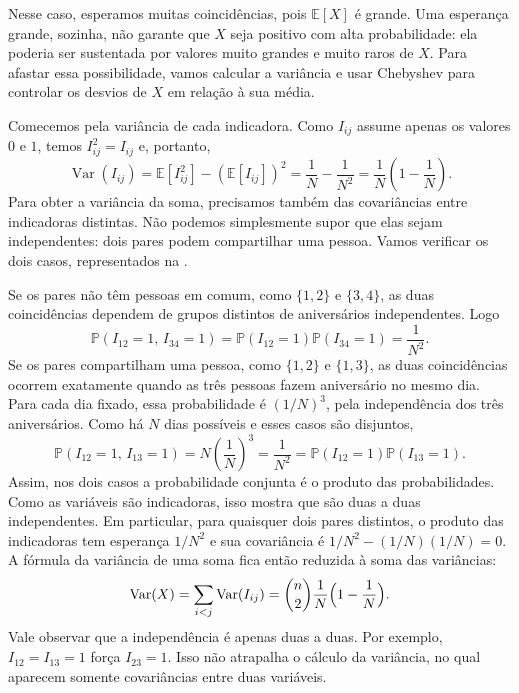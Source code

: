 \documentclass[12pt,portuguese]{article}
\theoremstyle{definition}
\theoremstyle{plainexercise}
\theoremstyle{starredexercise}
\theoremstyle{definition}
\begin{document}
Nesse caso, esperamos muitas coincidências, pois $\mathbb{E}[X]$ é grande.
Uma esperança grande, sozinha, não garante que $X$ seja positivo com alta
probabilidade: ela poderia ser sustentada por valores muito grandes e muito
raros de $X$. Para afastar essa possibilidade, vamos calcular a variância e
usar Chebyshev para controlar os desvios de $X$ em relação à sua média.

Comecemos pela variância de cada indicadora. Como $I_{ij}$ assume apenas
os valores $0$ e $1$, temos $I_{ij}^2=I_{ij}$ e, portanto,
\[
\operatorname{Var}(I_{ij})
=\mathbb{E}[I_{ij}^2]-(\mathbb{E}[I_{ij}])^2
=\frac1N-\frac1{N^2}
=\frac1N\left(1-\frac1N\right).
\]
Para obter a variância da soma, precisamos também das covariâncias entre
indicadoras distintas. Não podemos simplesmente supor que elas sejam
independentes: dois pares podem compartilhar uma pessoa. Vamos verificar
os dois casos, representados na .



Se os pares não têm pessoas em comum, como $\{1,2\}$ e $\{3,4\}$,
as duas coincidências dependem de grupos distintos de aniversários
independentes. Logo
\[
\mathbb{P}(I_{12}=1,\,I_{34}=1)
=\mathbb{P}(I_{12}=1)\mathbb{P}(I_{34}=1)
=\frac1{N^2}.
\]
Se os pares compartilham uma pessoa, como $\{1,2\}$ e $\{1,3\}$,
as duas coincidências ocorrem exatamente quando as três pessoas fazem
aniversário no mesmo dia. Para cada dia fixado, essa probabilidade é
$(1/N)^3$, pela independência dos três aniversários. Como há $N$ dias
possíveis e esses casos são disjuntos,
\[
\mathbb{P}(I_{12}=1,\,I_{13}=1)
=N\left(\frac1N\right)^3
=\frac1{N^2}
=\mathbb{P}(I_{12}=1)\mathbb{P}(I_{13}=1).
\]
Assim, nos dois casos a probabilidade conjunta é o produto das
probabilidades. Como as variáveis são indicadoras, isso mostra que são
duas a duas independentes. Em particular, para quaisquer dois pares
distintos, o produto das indicadoras tem esperança $1/N^2$ e sua
covariância é $1/N^2-(1/N)(1/N)=0$. A fórmula da variância de uma soma
fica então reduzida à soma das variâncias:
\[
\operatorname{Var}(X)
=
\sum_{i<j}\operatorname{Var}(I_{ij})
=
\binom{n}{2}\frac{1}{N}\Bigl(1-\frac{1}{N}\Bigr).
\]
Vale observar que a independência é apenas duas a duas. Por exemplo,
$I_{12}=I_{13}=1$ força $I_{23}=1$. Isso não atrapalha o cálculo da
variância, no qual aparecem somente covariâncias entre duas variáveis.
\end{document}
